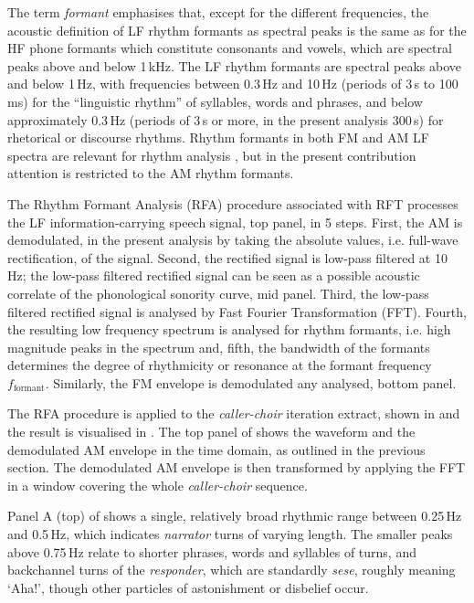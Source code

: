 \documentclass[output=paper,colorlinks,citecolor=brown]{langscibook}
\begin{document}
The term \textit{formant} emphasises that, except for the different frequencies, the acoustic definition of LF rhythm formants as spectral peaks is the same as for the HF phone formants which constitute consonants and vowels, which are spectral peaks above and below 1\,kHz. The LF rhythm formants are spectral peaks above and below 1\,Hz, with frequencies between 0.3\,Hz and 10\,Hz (periods of 3\,s to 100\,ms) for the “linguistic rhythm” \citep{libermanprince1977} of syllables, words and phrases, and below approximately 0.3\,Hz (periods of 3\,s or more, in the present analysis 300\,s) for rhetorical or discourse rhythms. Rhythm formants in both FM and AM LF spectra are relevant for rhythm analysis \citep{gibbonsp2018, gibbonjipa2021, gibbon4urua2022, gibbonsp2022}, but in the present contribution attention is restricted to the AM rhythm formants.

The Rhythm Formant Analysis (RFA) procedure associated with RFT processes the LF information-carrying speech signal,  top panel, in 5 steps. First, the AM is demodulated, in the present analysis by taking the absolute values, i.e. full-wave rectification, of the signal. Second, the rectified signal is low-pass filtered at 10\,Hz; the low-pass filtered rectified signal can be seen as a possible acoustic correlate of the phonological sonority curve,  mid panel. Third, the low-pass filtered rectified signal is analysed by Fast Fourier Transformation (FFT). Fourth, the resulting low frequency spectrum is analysed for rhythm formants, i.e. high magnitude peaks in the spectrum and, fifth, the bandwidth of the formants determines the degree of rhythmicity or resonance at the formant frequency $f_{\text{formant}}$. Similarly, the FM envelope is demodulated any analysed,  bottom panel.

The RFA procedure is applied to the \textit{caller-choir} iteration extract, shown in  and the result is visualised in . The top panel of  shows the waveform and the demodulated AM envelope in the time domain, as outlined in the previous section. The demodulated AM envelope is then transformed by applying the FFT in a window covering the whole \textit{caller-choir} sequence.

Panel A (top) of  shows a single, relatively broad rhythmic range between 0.25\,Hz and 0.5\,Hz, which indicates \textit{narrator} turns of varying length. The smaller peaks above 0.75\,Hz relate to shorter phrases, words and syllables of turns, and backchannel turns of the \textit{responder}, which are standardly \textit{sese}, roughly meaning `Aha!', though other particles of astonishment or disbelief occur.
\end{document}
